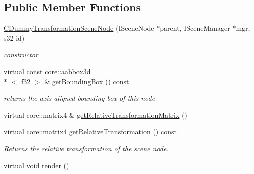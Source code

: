 \subsection*{Public Member Functions}
\begin{DoxyCompactItemize}
\item 
\hypertarget{classirr_1_1scene_1_1_c_dummy_transformation_scene_node_ac4026734c47cbc257548c1af3e4d6384}{\hyperlink{classirr_1_1scene_1_1_c_dummy_transformation_scene_node_ac4026734c47cbc257548c1af3e4d6384}{C\-Dummy\-Transformation\-Scene\-Node} (I\-Scene\-Node $\ast$parent, I\-Scene\-Manager $\ast$mgr, s32 id)}\label{classirr_1_1scene_1_1_c_dummy_transformation_scene_node_ac4026734c47cbc257548c1af3e4d6384}

\begin{DoxyCompactList}\small\item\em constructor \end{DoxyCompactList}\item 
\hypertarget{classirr_1_1scene_1_1_c_dummy_transformation_scene_node_a254e6558731f36885d31f3efcee5be6d}{virtual const core\-::aabbox3d\\*
$<$ f32 $>$ \& \hyperlink{classirr_1_1scene_1_1_c_dummy_transformation_scene_node_a254e6558731f36885d31f3efcee5be6d}{get\-Bounding\-Box} () const }\label{classirr_1_1scene_1_1_c_dummy_transformation_scene_node_a254e6558731f36885d31f3efcee5be6d}

\begin{DoxyCompactList}\small\item\em returns the axis aligned bounding box of this node \end{DoxyCompactList}\item 
virtual core\-::matrix4 \& \hyperlink{classirr_1_1scene_1_1_c_dummy_transformation_scene_node_abecb1b4cc6e57056a7ef71174dfe41f9}{get\-Relative\-Transformation\-Matrix} ()
\item 
\hypertarget{classirr_1_1scene_1_1_c_dummy_transformation_scene_node_a440491c56d0b602c94dd04d385aaeb7b}{virtual core\-::matrix4 \hyperlink{classirr_1_1scene_1_1_c_dummy_transformation_scene_node_a440491c56d0b602c94dd04d385aaeb7b}{get\-Relative\-Transformation} () const }\label{classirr_1_1scene_1_1_c_dummy_transformation_scene_node_a440491c56d0b602c94dd04d385aaeb7b}

\begin{DoxyCompactList}\small\item\em Returns the relative transformation of the scene node. \end{DoxyCompactList}\item 
\hypertarget{classirr_1_1scene_1_1_c_dummy_transformation_scene_node_a5c5533740143450d4e0c0675ab425baa}{virtual void \hyperlink{classirr_1_1scene_1_1_c_dummy_transformation_scene_node_a5c5533740143450d4e0c0675ab425baa}{render} ()}\label{classirr_1_1scene_1_1_c_dummy_transformation_scene_node_a5c5533740143450d4e0c0675ab425baa}


\end{DoxyCompactItemize}
